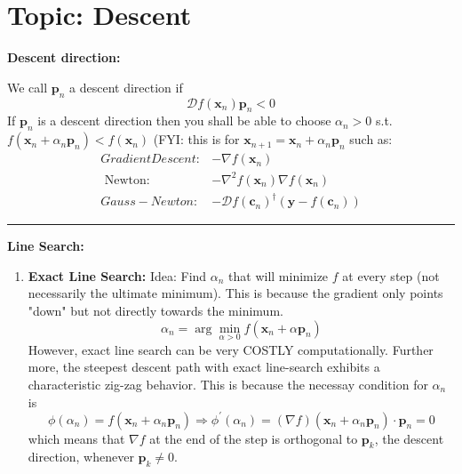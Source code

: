 \documentclass[11pt]{article}
\theoremstyle{plain} %
\newenvironment{topic}
{\color{C2}\normalfont\begin{framed}\begingroup }
  {\endgroup\end{framed}}
\theoremstyle{remark}
\begin{document}
\newpage
\section{Topic: Descent}
\begin{topic}

  \textbf{Descent direction:}

  We call $\mathbf{p}_n$ a descent direction if
  $$\mathcal{D} f\left(\mathbf{x}_n\right) \mathbf{p}_n<0$$
  If $\mathbf{p}_n$ is a descent direction then you shall be able to choose $\alpha_n>0$ s.t. $f\left(\mathbf{x}_n+\alpha_n \mathbf{p}_n\right)<f\left(\mathbf{x}_n\right)$
  (FYI: this is for $\mathbf{x}_{n+1}=\mathbf{x}_n+\alpha_n \mathbf{p}_n$ such as:
  $$
    \begin{aligned}
      Gradient Descent: & -\nabla f\left(\mathbf{x}_n\right)                                                                \\
      \text { Newton: } & -\nabla^2 f\left(\mathbf{x}_n\right) \nabla f\left(\mathbf{x}_n\right)                            \\
      Gauss-Newton:     & -\mathcal{D} f\left(\mathbf{c}_n\right)^\dagger\left(\mathbf{y}-f\left(\mathbf{c}_n\right)\right)
    \end{aligned}
  $$
  \vspace*{0.5em}

  \hrule

  \textbf{Line Search:}
  \begin{enumerate}
    \item \textbf{Exact Line Search:} Idea: Find $\alpha_n$ that will minimize $f$ at every step (not necessarily the ultimate minimum). This is because the gradient only points "down" but not directly towards the minimum.
          $$
            \alpha_n= \arg\min_{\alpha > 0} f\left(\mathbf{x}_n+\alpha \mathbf{p}_n\right)
          $$
          However, exact line search can be very COSTLY computationally. Further
          more, the steepest descent path with exact line-search exhibits a
          characteristic zig-zag behavior. This is because the necessay condition for $\alpha_n$ is
          \[
          \phi(\alpha_n)=f(\mathbf{x}_n+\alpha_n \mathbf{p}_n) 
          \Longrightarrow 
          \phi^{\prime}(\alpha_n)=(\nabla f)(\mathbf{x}_n+\alpha_n \mathbf{p}_n) \cdot \mathbf{p}_n=0
          \]
          which means that $\nabla f$ at the end of the step is orthogonal to
          $\mathbf{p}_k$, the descent direction, whenever $\mathbf{p}_k \neq 0$.
          

\end{enumerate}
\end{topic}
\end{document}
